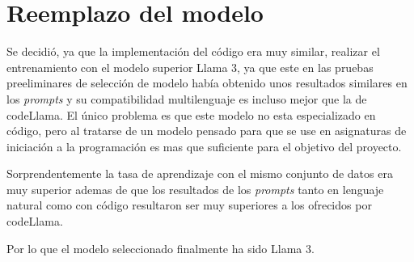 \section{Reemplazo del modelo}

Se decidió, ya que la implementación del código era muy similar, realizar el entrenamiento con el modelo superior Llama 3, ya que este en las pruebas preeliminares de selección de modelo había obtenido unos resultados similares en los \textit{prompts} y su compatibilidad multilenguaje es incluso mejor que la de codeLlama. El único problema es que este modelo no esta especializado en código, pero al tratarse de un modelo pensado para que se use en asignaturas de iniciación a la programación es mas que suficiente para el objetivo del proyecto.

Sorprendentemente la tasa de aprendizaje con el mismo conjunto de datos era muy superior ademas de que los resultados de los \textit{prompts} tanto en lenguaje natural como con código resultaron ser muy superiores a los ofrecidos por codeLlama.

Por lo que el modelo seleccionado finalmente ha sido Llama 3.



